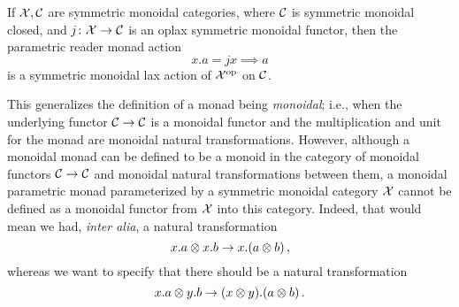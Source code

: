 \begin{example}
  If $\mathcal X,{\mathcal{C}}$ are symmetric monoidal categories, where ${\mathcal{C}}$ is symmetric monoidal closed, and $j\colon \mathcal X \to {\mathcal{C}}$ is an oplax symmetric monoidal functor, then the parametric reader monad action
  \[
    x.a = jx\implies a
    \]
  is a symmetric monoidal lax action of $\mathcal X^{\mathrm{op}}$ on ${\mathcal{C}}$.
\end{example}

\begin{remark}
  This generalizes the definition of a monad being \emph{monoidal}; i.e., when the underlying functor ${\mathcal{C}} \to {\mathcal{C}}$ is a monoidal functor and the multiplication and unit for the monad are monoidal natural transformations.  
  However, although a monoidal monad can be defined to be a monoid in the category of monoidal functors ${\mathcal{C}} \to {\mathcal{C}}$ and monoidal natural transformations between them, a monoidal parametric monad parameterized by a symmetric monoidal category $\mathcal X$ cannot be defined as a monoidal functor from $\mathcal X$ into this category.  
  Indeed, that would mean we had, \emph{inter alia}, a natural transformation
  \[
    x.a \otimes x.b \to x.(a\otimes b)\,,
    \]
  whereas we want to specify that there should be a natural transformation
  \[
    x.a \otimes y.b \to (x\otimes y).(a\otimes b)\,.
    \]
\end{remark}

